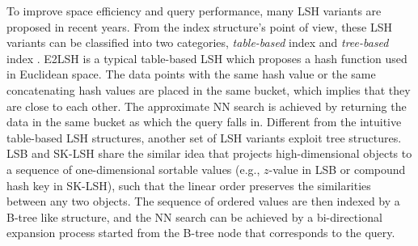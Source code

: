 To improve space efficiency and query performance, many LSH variants are proposed in recent years. From the index structure's point of view, these LSH variants can be classified into two categories, \emph{table-based} index \cite{Panigrahy:2006:EBN:1109557.1109688, mplsh,c2lsh,Haghani:2009:DSS:1516360.1516446,Huang:2015:QLH:2850469.2850470,Zheng:2016:LAN:2882903.2882930} and \emph{tree-based} index \cite{lsb,sklsh,Bawa:2005:LFS:1060745.1060840}. E2LSH \cite{datar} is a typical table-based LSH which proposes a hash function used in Euclidean space. The data points with the same hash value or the same concatenating hash values are placed in the same bucket, which implies that they are close to each other. The approximate NN search is achieved by returning the data in the same bucket as which the query falls in. Different from the intuitive table-based LSH structures, another set of LSH variants exploit tree structures. LSB \cite{lsb} and SK-LSH \cite{sklsh} share the similar idea that projects high-dimensional objects to a sequence of one-dimensional sortable values (e.g., $z$-value in LSB or compound hash key in SK-LSH), such that the linear order preserves the similarities between any two objects. The sequence of ordered values are then indexed by a B-tree like structure, and the NN search can be achieved by a bi-directional expansion process started from the B-tree node that corresponds to the query.





